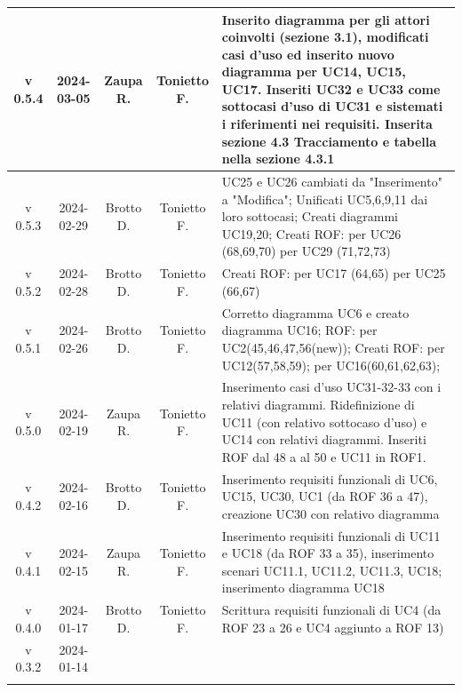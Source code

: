 \documentclass[12pt, oneside]{article}
\begin{document}
\begin{longtable}{|c|c|c|c|p{7cm}|}
\hline
v 0.5.4 & 2024-03-05 & Zaupa R. & Tonietto F. & Inserito diagramma per gli attori coinvolti (sezione 3.1), modificati casi d'uso ed inserito nuovo diagramma per UC14, UC15, UC17. Inseriti UC32 e UC33 come sottocasi d'uso di UC31 e sistemati i riferimenti nei requisiti. Inserita sezione 4.3 Tracciamento e tabella nella sezione 4.3.1\\
\hline
v 0.5.3 & 2024-02-29 & Brotto D. & Tonietto F. & UC25 e UC26 cambiati da "Inserimento" a "Modifica";
\newline Unificati UC5,6,9,11 dai loro sottocasi;
\newline Creati diagrammi UC19,20;
\newline Creati ROF:
\newline per UC26 (68,69,70)
\newline per UC29 (71,72,73)
\\
\hline
v 0.5.2 & 2024-02-28 & Brotto D. & Tonietto F. & Creati ROF:
\newline per UC17 (64,65) 
\newline per UC25 (66,67)
\\
\hline
v 0.5.1 & 2024-02-26 & Brotto D. & Tonietto F. & Corretto diagramma UC6 e creato diagramma UC16; \newline ROF: per UC2(45,46,47,56(new)); 
\newline Creati ROF: \newline per UC12(57,58,59); \newline per UC16(60,61,62,63); \\
\hline
v 0.5.0 & 2024-02-19 & Zaupa R. & Tonietto F. & Inserimento casi d'uso UC31-32-33 con i relativi diagrammi. Ridefinizione di UC11 (con relativo sottocaso d'uso) e UC14 con relativi diagrammi. Inseriti ROF dal 48 a al 50 e UC11 in ROF1. \\
\hline
v 0.4.2 & 2024-02-16 & Brotto D. & Tonietto F. & Inserimento requisiti funzionali di UC6, UC15, UC30, UC1 (da ROF 36 a 47), creazione UC30 con relativo diagramma \\
\hline
v 0.4.1 & 2024-02-15 & Zaupa R. & Tonietto F. & Inserimento requisiti funzionali di UC11 e UC18 (da ROF 33 a 35), inserimento scenari UC11.1, UC11.2, UC11.3, UC18; inserimento diagramma UC18 \\
\hline
v 0.4.0 & 2024-01-17 & Brotto D. & Tonietto F. & Scrittura requisiti funzionali di UC4 (da ROF 23 a 26 e UC4 aggiunto a ROF 13) \\
\hline
v 0.3.2 & 2024-01-14 & 
\begin{tabular}[c]{@{}c@{}}
    Davide B. \\

\end{tabular}
\end{longtable}
\end{document}
